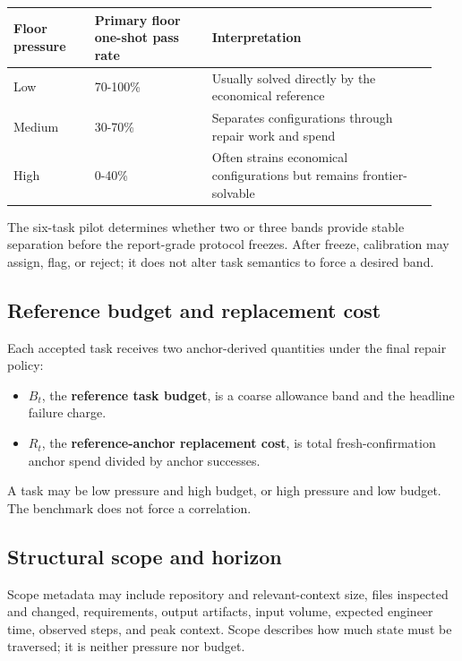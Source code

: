 \documentclass[11pt]{article}
\begin{document}
\begin{longtable}{@{}p{0.18\linewidth}p{0.26\linewidth}p{0.50\linewidth}@{}}
\hline
Floor pressure & Primary floor one-shot pass rate & Interpretation\\
\hline
Low & 70-100\% & Usually solved directly by the economical reference\\
Medium & 30-70\% & Separates configurations through repair work and spend\\
High & 0-40\% & Often strains economical configurations but remains frontier-solvable\\
\hline
\end{longtable}

The six-task pilot determines whether two or three bands provide stable separation before the report-grade protocol freezes. After freeze, calibration may assign, flag, or reject; it does not alter task semantics to force a desired band.

\subsection{Reference budget and replacement cost}\hypertarget{43-reference-budget-and-replacement-cost}{}\label{43-reference-budget-and-replacement-cost}

Each accepted task receives two anchor-derived quantities under the final repair policy:

\begin{itemize}
\item{} $B_t$, the \textbf{reference task budget}, is a coarse allowance band and the headline failure charge.
\item{} $R_t$, the \textbf{reference-anchor replacement cost}, is total fresh-confirmation anchor spend divided by anchor successes.
\end{itemize}

A task may be low pressure and high budget, or high pressure and low budget. The benchmark does not force a correlation.

\subsection{Structural scope and horizon}\hypertarget{44-structural-scope-and-horizon}{}\label{44-structural-scope-and-horizon}

Scope metadata may include repository and relevant-context size, files inspected and changed, requirements, output artifacts, input volume, expected engineer time, observed steps, and peak context. Scope describes how much state must be traversed; it is neither pressure nor budget.
\end{document}
